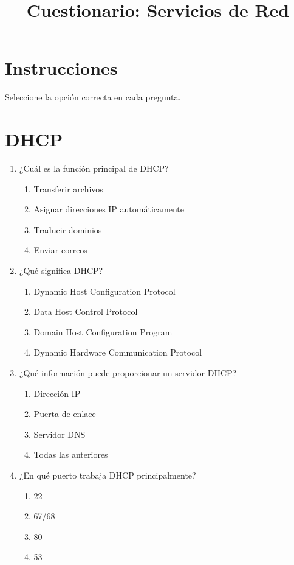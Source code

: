\documentclass[12pt]{article}
\title{Cuestionario: Servicios de Red}
\date{}
\begin{document}
\maketitle

\section*{Instrucciones}
Seleccione la opción correcta en cada pregunta.

\section*{DHCP}

\begin{enumerate}[label=\textbf{DHCP-\arabic*.}]

\item ¿Cuál es la función principal de DHCP?
\begin{enumerate}[label=\alph*)]
\item Transferir archivos
\item Asignar direcciones IP automáticamente
\item Traducir dominios
\item Enviar correos
\end{enumerate}

\item ¿Qué significa DHCP?
\begin{enumerate}[label=\alph*)]
\item Dynamic Host Configuration Protocol
\item Data Host Control Protocol
\item Domain Host Configuration Program
\item Dynamic Hardware Communication Protocol
\end{enumerate}

\item ¿Qué información puede proporcionar un servidor DHCP?
\begin{enumerate}[label=\alph*)]
\item Dirección IP
\item Puerta de enlace
\item Servidor DNS
\item Todas las anteriores
\end{enumerate}

\item ¿En qué puerto trabaja DHCP principalmente?
\begin{enumerate}[label=\alph*)]
\item 22
\item 67/68
\item 80
\item 53
\end{enumerate}


\end{enumerate}
\end{document}
